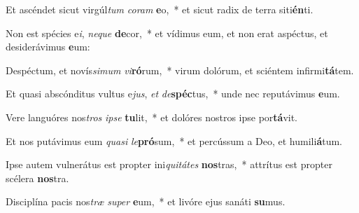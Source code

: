 \item Et ascéndet sicut virgúl\textit{tum} \textit{co}\textit{ram} \textbf{e}o,~* et sicut radix de terra siti\textbf{én}ti.
\item Non est spécies e\textit{i}, \textit{ne}\textit{que} \textbf{de}cor,~* et vídimus eum, et non erat aspéctus, et desiderávimus \textbf{e}um:
\item Despéctum, et novís\textit{si}\textit{mum} \textit{vi}\textbf{ró}rum,~* virum dolórum, et sciéntem infirmi\textbf{tá}tem.
\item Et quasi abscónditus vultus e\textit{jus}, \textit{et} \textit{de}\textbf{spéc}tus,~* unde nec reputávimus \textbf{e}um.
\item Vere languóres nos\textit{tros} \textit{ip}\textit{se} \textbf{tu}lit,~* et dolóres nostros ipse por\textbf{tá}vit.
\item Et nos putávimus eum \textit{qua}\textit{si} \textit{le}\textbf{pró}sum,~* et percússum a Deo, et humili\textbf{á}tum.
\item Ipse autem vulnerátus est propter ini\textit{qui}\textit{tá}\textit{tes} \textbf{nos}tras,~* attrítus est propter scélera \textbf{nos}tra.
\item Disciplína pacis nos\textit{træ} \textit{su}\textit{per} \textbf{e}um,~* et livóre ejus sanáti \textbf{su}mus.
